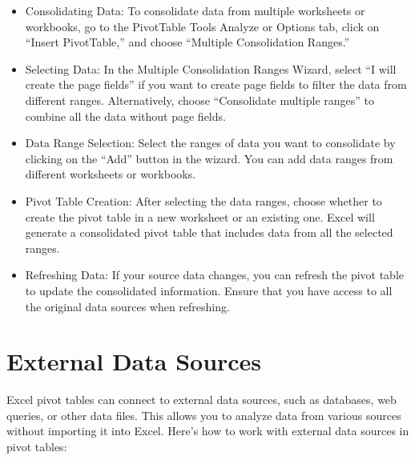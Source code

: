 \documentclass[
]{book}
\begin{document}
\begin{itemize}
\item
  Consolidating Data: To consolidate data from multiple worksheets or workbooks, go to the PivotTable Tools Analyze or Options tab, click on ``Insert PivotTable,'' and choose ``Multiple Consolidation Ranges.''
\item
  Selecting Data: In the Multiple Consolidation Ranges Wizard, select ``I will create the page fields'' if you want to create page fields to filter the data from different ranges. Alternatively, choose ``Consolidate multiple ranges'' to combine all the data without page fields.
\item
  Data Range Selection: Select the ranges of data you want to consolidate by clicking on the ``Add'' button in the wizard. You can add data ranges from different worksheets or workbooks.
\item
  Pivot Table Creation: After selecting the data ranges, choose whether to create the pivot table in a new worksheet or an existing one. Excel will generate a consolidated pivot table that includes data from all the selected ranges.
\item
  Refreshing Data: If your source data changes, you can refresh the pivot table to update the consolidated information. Ensure that you have access to all the original data sources when refreshing.
\end{itemize}

\hypertarget{external-data-sources}{%
\section{External Data Sources}\label{external-data-sources}}

Excel pivot tables can connect to external data sources, such as databases, web queries, or other data files. This allows you to analyze data from various sources without importing it into Excel. Here's how to work with external data sources in pivot tables:
\end{document}
